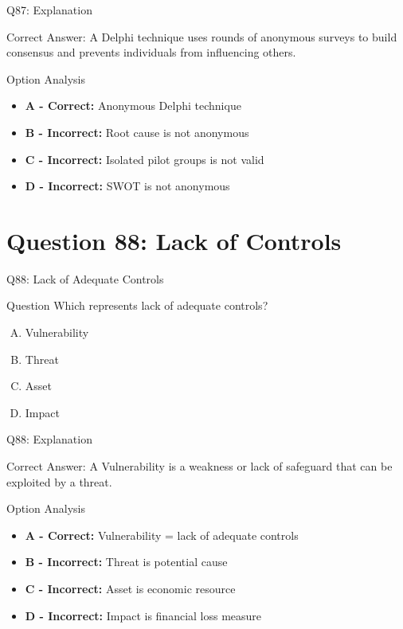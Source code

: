 \documentclass{beamer}
\begin{document}
	\begin{frame}{Q87: Explanation}
		\begin{block}{Correct Answer: A}
			Delphi technique uses rounds of anonymous surveys to build consensus and prevents individuals from influencing others.
		\end{block}
		\begin{block}{Option Analysis}
			\begin{itemize}
				\item \textbf{A - Correct:} Anonymous Delphi technique
				\item \textbf{B - Incorrect:} Root cause is not anonymous
				\item \textbf{C - Incorrect:} Isolated pilot groups is not valid
				\item \textbf{D - Incorrect:} SWOT is not anonymous
			\end{itemize}
		\end{block}
	\end{frame}
	
	\section{Question 88: Lack of Controls}
	
	\begin{frame}{Q88: Lack of Adequate Controls}
		\begin{block}{Question}
			Which represents lack of adequate controls?
		\end{block}
		\begin{enumerate}[(A)]
			\item Vulnerability
			\item Threat
			\item Asset
			\item Impact
		\end{enumerate}
	\end{frame}
	
	\begin{frame}{Q88: Explanation}
		\begin{block}{Correct Answer: A}
			Vulnerability is a weakness or lack of safeguard that can be exploited by a threat.
		\end{block}
		\begin{block}{Option Analysis}
			\begin{itemize}
				\item \textbf{A - Correct:} Vulnerability = lack of adequate controls
				\item \textbf{B - Incorrect:} Threat is potential cause
				\item \textbf{C - Incorrect:} Asset is economic resource
				\item \textbf{D - Incorrect:} Impact is financial loss measure
			\end{itemize}
		\end{block}
	\end{frame}
	
\end{document}
